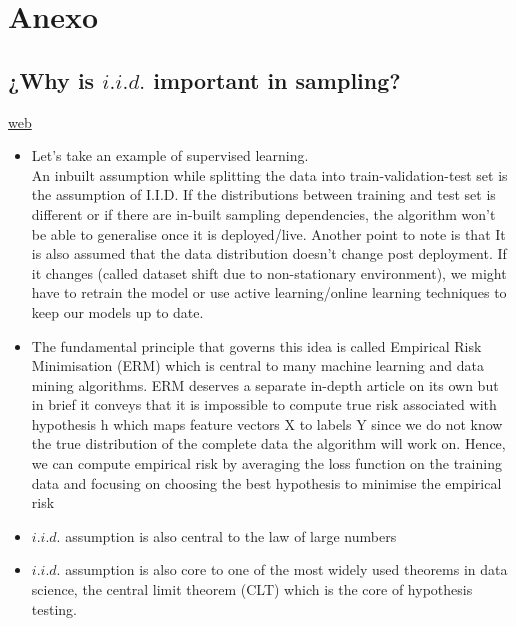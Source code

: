 \documentclass[11pt,a4paper]{article}
\theoremstyle{definition}
\begin{document}
	\section{Anexo}
	\subsection{¿Why is $i.i.d.$ important in sampling?}
	\label{sec:anexo1}
	\href{https://medium.datadriveninvestor.com/significance-of-i-i-d-in-machine-learning-281da0d0cbef}{web}
	\begin{itemize}
			\item Let’s take an example of supervised learning. \\ An inbuilt assumption while splitting the data into train-validation-test set is the assumption of I.I.D. If the distributions between training and test set is different or if there are in-built sampling dependencies, the algorithm won’t be able to generalise once it is deployed/live.
Another point to note is that It is also assumed that the data distribution doesn’t change post deployment. If it changes (called dataset shift due to non-stationary environment), we might have to retrain the model or use active learning/online learning techniques to keep our models up to date.
			\item The fundamental principle that governs this idea is called Empirical Risk Minimisation (ERM) which is central to many machine learning and data mining algorithms. ERM deserves a separate in-depth article on its own but in brief it conveys that it is impossible to compute true risk associated with hypothesis h which maps feature vectors X to labels Y since we do not know the true distribution of the complete data the algorithm will work on. Hence, we can compute empirical risk by averaging the loss function on the training data and focusing on choosing the best hypothesis to minimise the empirical risk
			\item $i.i.d.$ assumption is also central to the law of large numbers
			\item $i.i.d.$ assumption is also core to one of the most widely used theorems in data science, the central limit theorem (CLT) which is the core of hypothesis testing.
		\end{itemize}
\end{document}
